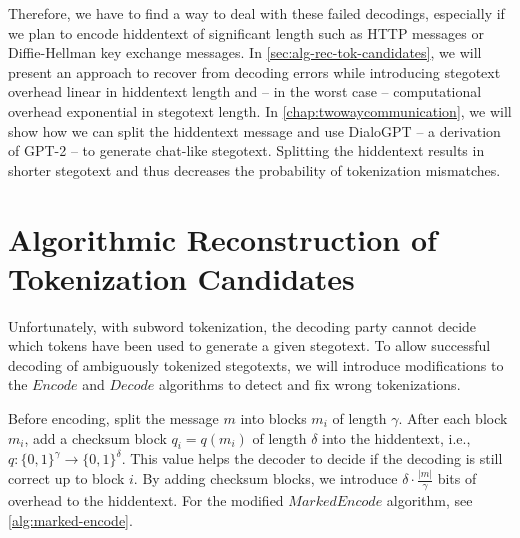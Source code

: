 
Therefore, we have to find a way to deal with these failed decodings, especially if we plan to encode hiddentext of significant length such as HTTP messages or Diffie-Hellman key exchange messages.
In \autoref{sec:alg-rec-tok-candidates}, we will present an approach to recover from decoding errors while introducing stegotext overhead linear in hiddentext length and -- in the worst case -- computational overhead exponential in stegotext length.
In \autoref{chap:twowaycommunication}, we will show how we can split the hiddentext message and use DialoGPT -- a derivation of GPT-2 -- to generate chat-like stegotext.
Splitting the hiddentext results in shorter stegotext and thus decreases the probability of tokenization mismatches.



\section{Algorithmic Reconstruction of Tokenization Candidates}
\label{sec:alg-rec-tok-candidates}

Unfortunately, with subword tokenization, the decoding party cannot decide which tokens have been used to generate a given stegotext.
To allow successful decoding of ambiguously tokenized stegotexts, we will introduce modifications to the $Encode$ and $Decode$ algorithms to detect and fix wrong tokenizations.

Before encoding, split the message $m$ into blocks $m_i$ of length $\gamma$.
After each block $m_i$, add a checksum block $q_i = q(m_i)$ of length $\delta$ into the hiddentext, i.e., $q \colon \{ 0,1 \}^\gamma \rightarrow \{ 0,1 \}^\delta$.
This value helps the decoder to decide if the decoding is still correct up to block $i$.
By adding checksum blocks, we introduce $\delta \cdot \frac{|m|}{\gamma}$ bits of overhead to the hiddentext.
For the modified $MarkedEncode$ algorithm, see \autoref{alg:marked-encode}.

